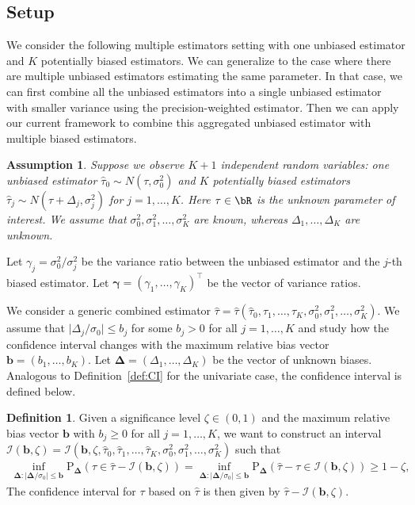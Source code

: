\documentclass[11pt]{article}
\def\P{{\mathrm P}}
\def\cI{{\mathcal I}}
\newcommand{\htau}{\widehat\tau}
\numberwithin{equation}{section}
\newtheorem{assumption}{Assumption}[section]
\theoremstyle{definition}
\newtheorem{definition}{Definition}[section]
\begin{document}
\subsection{Setup}

We consider the following multiple estimators setting with one unbiased estimator and $K$ potentially biased estimators. We can generalize to the case where there are multiple unbiased estimators estimating the same parameter. In that case, we can first combine all the unbiased estimators into a single unbiased estimator with smaller variance using the precision-weighted estimator. Then we can apply our current framework to combine this aggregated unbiased estimator with multiple biased estimators.
\begin{assumption}\label{ass:normal_multi_data}
  Suppose we observe $K+1$ independent random variables: one unbiased estimator $\htau_0 \sim N(\tau,\sigma_0^2)$ and $K$ potentially biased estimators $\htau_j \sim N(\tau + \Delta_j,\sigma_j^2)$ for $j = 1,\ldots,K$. Here $\tau \in \bR$ is the unknown parameter of interest. We assume that $\sigma_0^2, \sigma_1^2, \ldots, \sigma_K^2$ are known, whereas $\Delta_1, \ldots, \Delta_K$ are unknown. 
\end{assumption}
Let $\gamma_j = \sigma_0^2/\sigma_j^2$ be the variance ratio between the unbiased estimator and the $j$-th biased estimator. Let $\bm{\gamma} = (\gamma_1,\ldots,\gamma_K)^\top$ be the vector of variance ratios.

We consider a generic combined estimator $\hat\tau = \hat\tau(\htau_0, \htau_1, \ldots, \htau_K, \sigma_0^2, \sigma_1^2, \ldots, \sigma_K^2)$. We assume that $\lvert \Delta_j/\sigma_0 \rvert \le b_j$ for some $b_j > 0$ for all $j = 1,\ldots,K$ and  study how the confidence interval changes with the maximum relative bias vector $\bm{b} = (b_1,\ldots,b_K)$. Let $\bm{\Delta} = (\Delta_1,\ldots,\Delta_K)$ be the vector of unknown biases. Analogous to Definition~\ref{def:CI} for the univariate case, the confidence interval is defined below.


\begin{definition}\label{def:CI_multi_data}
  Given a significance level $\zeta \in (0,1)$ and the maximum relative bias vector $\bm{b}$ with $b_j \ge 0$ for all $j=1,\ldots,K$, we want to construct an interval $\cI(\bm{b}, \zeta) = \cI(\bm{b}, \zeta, \htau_0, \htau_1, \ldots, \htau_K, \sigma_0^2, \sigma_1^2, \ldots, \sigma_K^2)$ such that
  \begin{align}\label{eq:coverage_multi_data}
    \inf_{\bm{\Delta}: \lvert \bm{\Delta}/\sigma_0 \rvert \le \bm{b}} \P_{\bm{\Delta}}(\tau \in \hat\tau - \cI(\bm{b}, \zeta)) 
    = \inf_{\bm{\Delta}: \lvert \bm{\Delta}/\sigma_0 \rvert \le \bm{b}} \P_{\bm{\Delta}}(\hat\tau - \tau \in \cI(\bm{b}, \zeta)) \ge 1 - \zeta,
  \end{align}
The confidence interval for $\tau$ based on $\hat\tau$ is then given by $\hat\tau - \cI(\bm{b}, \zeta)$.
\end{definition}
\end{document}
